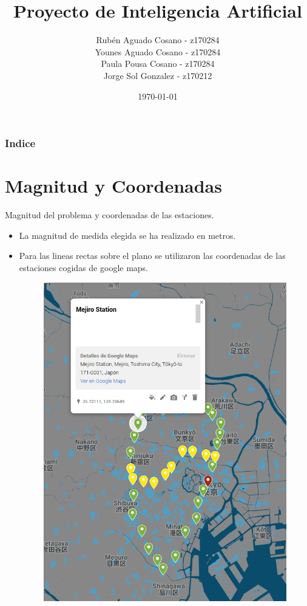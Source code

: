 \documentclass{beamer}
\title[Short title]{Proyecto de Inteligencia Artificial}
\author{Rubén Aguado Cosano - z170284 \\ Younes Aguado Cosano - z170284 \\ Paula Pousa Cosano - z170284 \\ Jorge Sol Gonzalez - z170212}
\institute[ETSIINF UPM] 
{
  \textcolor{upmBlue}{Universidad Politecnica de Madrid}\\
\medskip
}
\date{\today}
\begin{document}
\begin{frame}
\titlepage
\end{frame}

\begin{frame}
\frametitle{Indice}
\tableofcontents
\end{frame}



\section{Magnitud y Coordenadas}
\begin{frame}{Magnitud del problema y coordenadas de las estaciones.}
    \begin{itemize}
        \item La magnitud de medida elegida se ha realizado en metros.
        \item Para las lineas rectas sobre el plano se utilizaron las coordenadas de las estaciones cogidas de google maps.
        \vspace{0.5cm}
        \begin{figure}[H]
         \centering
         \includegraphics[scale=0.20]{"../pics/ejemploCoordenadas.png"}
        \end{figure}
    \end{itemize}
\end{frame}
\end{document}
